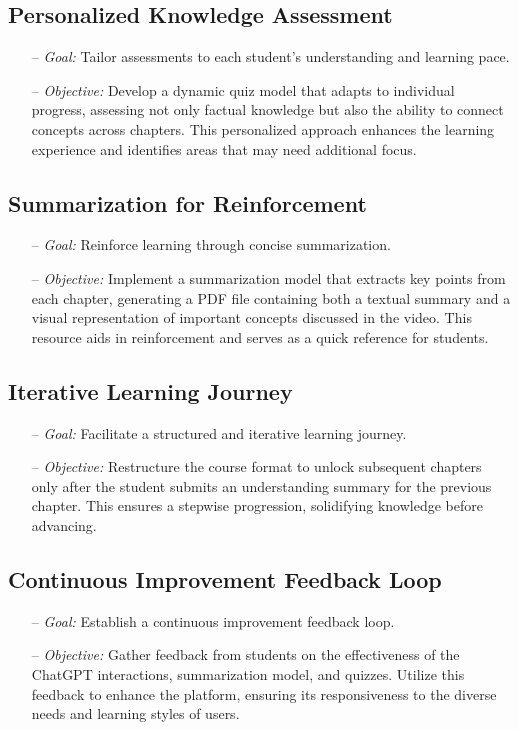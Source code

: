 	\subsection{Personalized Knowledge Assessment}
	\begin{itemize}
		\item [--] \textit{Goal:} Tailor assessments to each student's understanding and learning pace.
		\item [--] \textit{Objective:} Develop a dynamic quiz model that adapts to individual progress, assessing not only factual knowledge but also the ability to connect concepts across chapters. This personalized approach enhances the learning experience and identifies areas that may need additional focus.
	\end{itemize}
		
	\subsection{Summarization for Reinforcement}
	\begin{itemize}
		\item [--] \textit{Goal:} Reinforce learning through concise summarization.
		\item [--] \textit{Objective:} Implement a summarization model that extracts key points from each chapter, generating a PDF file containing both a textual summary and a visual representation of important concepts discussed in the video. This resource aids in reinforcement and serves as a quick reference for students.
	\end{itemize}
		
	\subsection{Iterative Learning Journey}	
	\begin{itemize}
		\item [--] \textit{Goal:} Facilitate a structured and iterative learning journey.
		\item [--] \textit{Objective:} Restructure the course format to unlock subsequent chapters only after the student submits an understanding summary for the previous chapter. This ensures a stepwise progression, solidifying knowledge before advancing.
	\end{itemize}

	\subsection{Continuous Improvement Feedback Loop}
	\begin{itemize}
		\item [--] \textit{Goal:} Establish a continuous improvement feedback loop.
		\item [--] \textit{Objective:} Gather feedback from students on the effectiveness of the ChatGPT interactions, summarization model, and quizzes. Utilize this feedback to enhance the platform, ensuring its responsiveness to the diverse needs and learning styles of users.
	\end{itemize}


